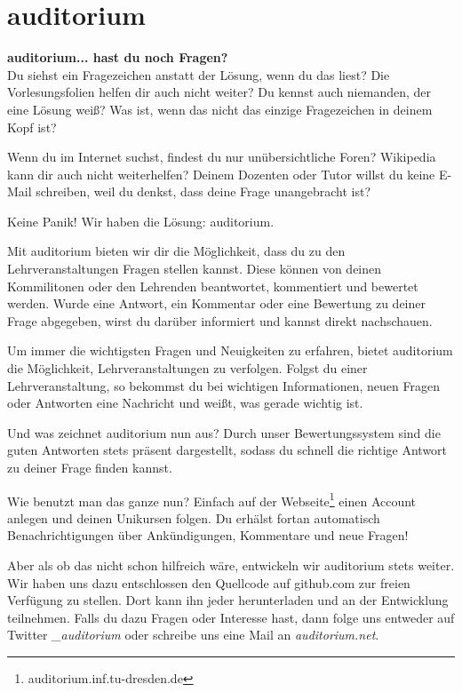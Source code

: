 \section{auditorium}


\textbf{auditorium... hast du noch Fragen?} \\
Du siehst ein Fragezeichen anstatt der Lösung, wenn du das liest?
Die Vorlesungsfolien helfen dir auch nicht weiter? Du kennst auch niemanden, der eine Lösung weiß?
Was ist, wenn das nicht das einzige Fragezeichen in deinem Kopf ist?

Wenn du im Internet suchst, findest du nur unübersichtliche Foren?
Wikipedia kann dir auch nicht weiterhelfen?
Deinem Dozenten oder Tutor willst du keine E-Mail schreiben, weil du denkst, dass deine Frage unangebracht ist?

Keine Panik!
Wir haben die Lösung: auditorium.

Mit auditorium bieten wir dir die Möglichkeit, dass du zu den Lehrveranstaltungen Fragen stellen kannst.
Diese können von deinen Kommilitonen oder den Lehrenden beantwortet, kommentiert und bewertet werden.
Wurde eine Antwort, ein Kommentar oder eine Bewertung zu deiner Frage abgegeben, wirst du darüber informiert und kannst direkt nachschauen.

Um immer die wichtigsten Fragen und Neuigkeiten zu erfahren, bietet auditorium die Möglichkeit, Lehrveranstaltungen zu verfolgen.
Folgst du einer Lehrveranstaltung, so bekommst du bei wichtigen Informationen, neuen Fragen oder Antworten eine Nachricht und weißt, was gerade wichtig ist.

Und was zeichnet auditorium nun aus?
Durch unser Bewertungssystem sind die guten Antworten stets präsent dargestellt, sodass du schnell die richtige Antwort zu deiner Frage finden kannst.

Wie benutzt man das ganze nun?
Einfach auf der Webseite\footnote{auditorium.inf.tu-dresden.de} einen Account anlegen und deinen Unikursen folgen.
Du erhälst fortan automatisch Benachrichtigungen über Ankündigungen, Kommentare und neue Fragen!

Aber als ob das nicht schon hilfreich wäre, entwickeln wir auditorium stets weiter.
Wir haben uns dazu entschlossen den Quellcode auf github.com zur freien Verfügung zu stellen.
Dort kann ihn jeder herunterladen und an der Entwicklung teilnehmen.
Falls du dazu Fragen oder Interesse hast, dann folge uns entweder auf Twitter \textit{\@\_auditorium} oder schreibe uns eine Mail an \textit{auditorium\@inftex.net}.

